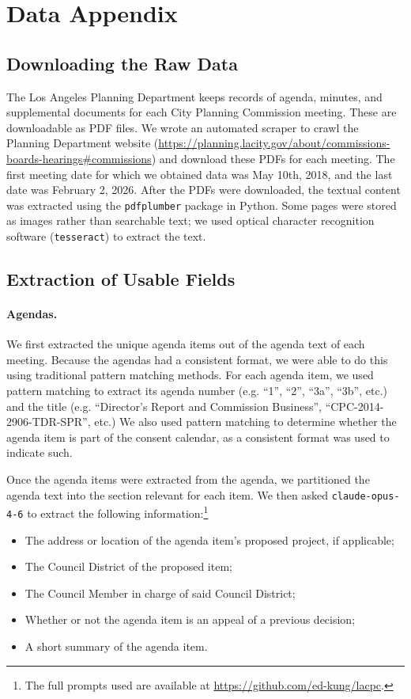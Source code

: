 \section{Data Appendix} \label{sec_data_appendix}

\subsection{Downloading the Raw Data}

The Los Angeles Planning Department keeps records of agenda, minutes, and supplemental documents for each City Planning Commission meeting. These are downloadable as PDF files. We wrote an automated scraper to crawl the Planning Department website (\url{https://planning.lacity.gov/about/commissions-boards-hearings#commissions}) and download these PDFs for each meeting. The first meeting date for which we obtained data was May 10th, 2018, and the last date was February 2, 2026. After the PDFs were downloaded, the textual content was extracted using the \texttt{pdfplumber} package in Python. Some pages were stored as images rather than searchable text; we used optical character recognition software (\texttt{tesseract}) to extract the text.


\subsection{Extraction of Usable Fields}

\paragraph{Agendas.} We first extracted the unique agenda items out of the agenda text of each meeting. Because the agendas had a consistent format, we were able to do this using traditional pattern matching methods. For each agenda item, we used pattern matching to extract its agenda number (e.g. ``1'', ``2'', ``3a'', ``3b'', etc.) and the title (e.g. ``Director's Report and Commission Business'', ``CPC-2014-2906-TDR-SPR'', etc.) We also used pattern matching to determine whether the agenda item is part of the consent calendar, as a consistent format was used to indicate such. 

Once the agenda items were extracted from the agenda, we partitioned the agenda text into the section relevant for each item. We then asked \texttt{claude-opus-4-6} to extract the following information:\footnote{The full prompts used are available at \url{https://github.com/ed-kung/lacpc}.} 
\begin{itemize}
\item The address or location of the agenda item's proposed project, if applicable;
\item The Council District of the proposed item;
\item The Council Member in charge of said Council District;
\item Whether or not the agenda item is an appeal of a previous decision;
\item A short summary of the agenda item.
\end{itemize}

